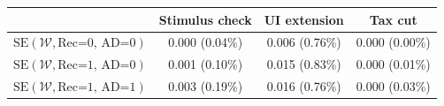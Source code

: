 \begin{tabular}{@{}lccc@{}}
\toprule
                          & Stimulus check      & UI extension    & Tax cut    \\  \midrule
$\mathrm{SE}(\mathcal{W}, \text{Rec=0, AD=0})$ & 0.000 (0.04\%)  & 0.006 (0.76\%)  & 0.000 (0.00\%)     \\
$\mathrm{SE}(\mathcal{W}, \text{Rec=1, AD=0})$ & 0.001 (0.10\%)  & 0.015 (0.83\%)  & 0.000 (0.01\%)     \\
$\mathrm{SE}(\mathcal{W}, \text{Rec=1, AD=1})$ & 0.003 (0.19\%)  & 0.016 (0.76\%)  & 0.000 (0.03\%)     \\ \bottomrule
\end{tabular}
